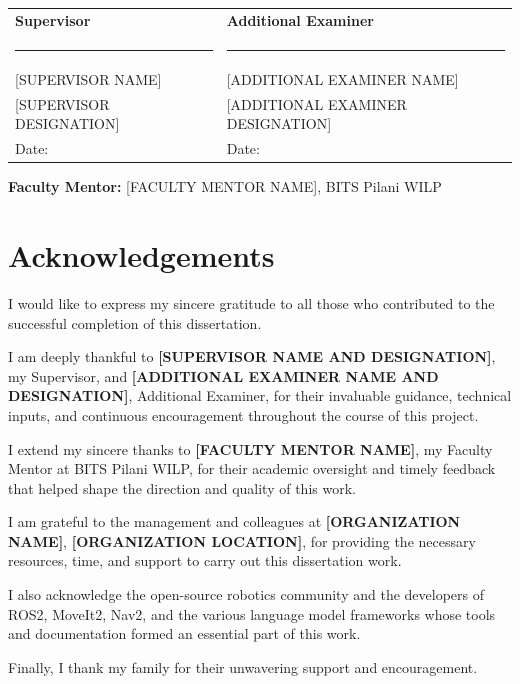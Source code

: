 \documentclass[12pt,a4paper]{article}
\begin{document}
\vspace{2.5cm}
\noindent
\begin{tabular}{@{}p{}p{}@{}}
\textbf{Supervisor} & \textbf{Additional Examiner} \\[2.5cm]
\hrule & \hrule \\[0.3cm]
{[SUPERVISOR NAME]}      & {[ADDITIONAL EXAMINER NAME]} \\
{[SUPERVISOR DESIGNATION]} & {[ADDITIONAL EXAMINER DESIGNATION]} \\[0.2cm]
Date: \underline{\hspace{3.5cm}} & Date: \underline{\hspace{3.5cm}}
\end{tabular}

\vspace{1.5cm}
\noindent
\textbf{Faculty Mentor:} [FACULTY MENTOR NAME], BITS Pilani WILP

\newpage
\section*{Acknowledgements}

I would like to express my sincere gratitude to all those who contributed to the successful completion of this dissertation.

I am deeply thankful to \textbf{[SUPERVISOR NAME AND DESIGNATION]}, my Supervisor, and \textbf{[ADDITIONAL EXAMINER NAME AND DESIGNATION]}, Additional Examiner, for their invaluable guidance, technical inputs, and continuous encouragement throughout the course of this project.

I extend my sincere thanks to \textbf{[FACULTY MENTOR NAME]}, my Faculty Mentor at BITS Pilani WILP, for their academic oversight and timely feedback that helped shape the direction and quality of this work.

I am grateful to the management and colleagues at \textbf{[ORGANIZATION NAME]}, \textbf{[ORGANIZATION LOCATION]}, for providing the necessary resources, time, and support to carry out this dissertation work.

I also acknowledge the open-source robotics community and the developers of ROS2, MoveIt2, Nav2, and the various language model frameworks whose tools and documentation formed an essential part of this work.

Finally, I thank my family for their unwavering support and encouragement.
\end{document}
